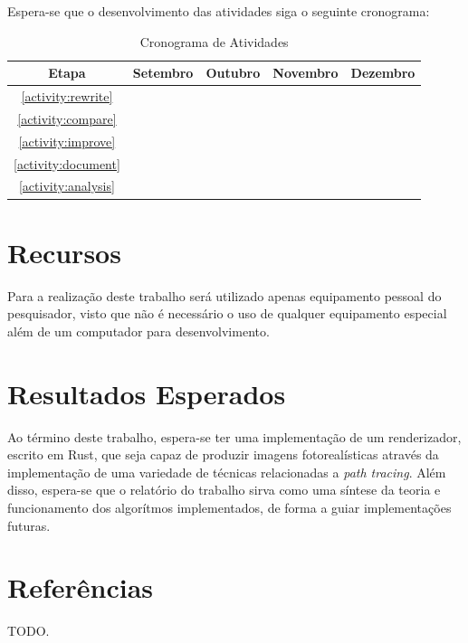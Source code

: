 \documentclass[12pt]{article}
\newcommand{\todo}[1]{\textsf{\color{red}#1}}
\begin{document}
Espera-se que o desenvolvimento das atividades siga o seguinte cronograma:

\begin{table}[h]
\centering
\begin{tabular}{c|cccc}
	Etapa & Setembro & Outubro & Novembro & Dezembro \\ \hline
	\ref{activity:rewrite} & \checkmark & & & \\
	\ref{activity:compare} & \checkmark & & & \\
	\ref{activity:improve} & & \checkmark & \checkmark & \\
	\ref{activity:document} & \checkmark & \checkmark & \checkmark & \checkmark \\
	\ref{activity:analysis} & & & & \checkmark \\
\end{tabular}
\caption{Cronograma de Atividades}
\end{table}

\section{Recursos}

Para a realização deste trabalho será utilizado apenas equipamento pessoal do pesquisador, visto que não é necessário o uso de qualquer equipamento especial além de um computador para desenvolvimento.

\section{Resultados Esperados}

Ao término deste trabalho, espera-se ter uma implementação de um renderizador, escrito em Rust, que seja capaz de produzir imagens fotorealísticas através da implementação de uma variedade de técnicas relacionadas a \emph{path tracing}. Além disso, espera-se que o relatório do trabalho sirva como uma síntese da teoria e funcionamento dos algorítmos implementados, de forma a guiar implementações futuras.

\section{Referências}

\todo{TODO.}
\end{document}
